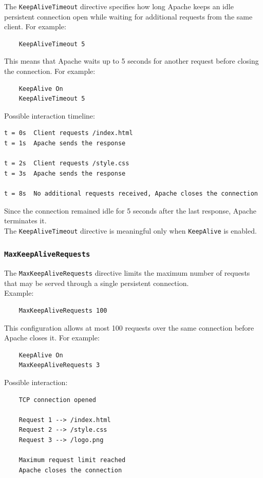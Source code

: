 \documentclass{scrbook}
\begin{document}
	The \texttt{KeepAliveTimeout} directive specifies how long Apache keeps an idle persistent connection open while waiting for additional requests from the same client. For example:
	\begin{lstlisting}
	KeepAliveTimeout 5
	\end{lstlisting}
	
	This means that Apache waits up to 5 seconds for another request before closing the connection.	For example:
	\begin{lstlisting}
	KeepAlive On
	KeepAliveTimeout 5
	\end{lstlisting}
	
	Possible interaction timeline:
	
	\begin{lstlisting}
t = 0s  Client requests /index.html
t = 1s  Apache sends the response
	
t = 2s  Client requests /style.css
t = 3s  Apache sends the response
	
t = 8s  No additional requests received, Apache closes the connection
	\end{lstlisting}
	
	Since the connection remained idle for 5 seconds after the last response, Apache terminates it.\\
	
	The \texttt{KeepAliveTimeout} directive is meaningful only when \texttt{KeepAlive} is enabled.
	
	\subsubsection{\texttt{MaxKeepAliveRequests}}
	
	The \texttt{MaxKeepAliveRequests} directive limits the maximum number of requests that may be served through a single persistent connection.\\
	
	Example:
	\begin{lstlisting}
	MaxKeepAliveRequests 100
	\end{lstlisting}
	
	This configuration allows at most 100 requests over the same connection before Apache closes it. For example:
	\begin{lstlisting}
	KeepAlive On
	MaxKeepAliveRequests 3
	\end{lstlisting}
	
	Possible interaction:
	\begin{lstlisting}
	TCP connection opened
		
	Request 1 --> /index.html
	Request 2 --> /style.css
	Request 3 --> /logo.png
		
	Maximum request limit reached
	Apache closes the connection
	\end{lstlisting}
	
\end{document}

